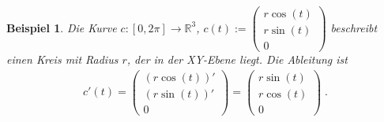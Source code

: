 \documentclass[]{article}
\newtheorem{Beispiel}{Beispiel}
\begin{document}
\begin{Beispiel}
Die Kurve 
$c : [0, 2\pi]  \to  \mathbb{R}^3$, $c(t) :=  \begin{pmatrix} r \cos(t) \\ r  \sin(t) \\  0 \end{pmatrix}$
beschreibt einen Kreis mit Radius $r$, der in der XY-Ebene liegt. Die Ableitung ist
\begin{align*}
c'(t) =  \begin{pmatrix} (r \cos(t))' \\  (r\sin(t))' \\  0 \end{pmatrix} = \begin{pmatrix} r \sin(t) \\ r \cos(t) \\  0 \end{pmatrix} \;.
\end{align*} 
\end{Beispiel}
\end{document}
